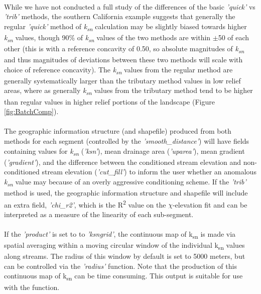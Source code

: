 \paragraph{}While we have not conducted a full study of the differences of the basic \textit{'quick'} vs \textit{'trib'} methods, the southern California example suggests that generally the regular \textit{'quick'} method of \textit{k\textsubscript{sn}} calculation may be slightly biased towards higher \textit{k\textsubscript{sn}} values, though 90\% of \textit{k\textsubscript{sn}} values of the two methods are within $\pm$50 of each other (this is with a reference concavity of 0.50, so absolute magnitudes of \textit{k\textsubscript{sn}} and thus magnitudes of deviations between these two methods will scale with choice of reference concavity). The \textit{k\textsubscript{sn}} values from the regular method are generally systematically larger than the tributary method values in low relief areas, where as generally \textit{k\textsubscript{sn}} values from the tributary method tend to be higher than regular values in higher relief portions of the landscape (Figure \ref{fig:BatchComp}). 

\paragraph{}The geographic information structure (and shapefile) produced from both methods for each segment (controlled by the \textit{'smooth\_distance'}) will have fields containing values for \textit{k\textsubscript{sn}} (\textit{'ksn'}), mean drainage area (\textit{'uparea'}), mean gradient (\textit{'gradient'}), and the difference between the conditioned stream elevation and non-conditioned stream elevation (\textit{'cut\_fill'}) to inform the user whether an anomalous \textit{k\textsubscript{sn}} value may because of an overly aggressive conditioning scheme. If the \textit{'trib'} method is used, the geographic information structure and shapefile will include an extra field, \textit{'chi\_r2'}, which is the R\textsuperscript{2} value on the $\chi$-elevation fit and can be interpreted as a measure of the linearity of each sub-segment. 

\paragraph{}If the \textit{'product'} is set to to \textit{'ksngrid'}, the continuous map of k\textsubscript{sn} is made via spatial averaging within a moving circular window of the individual k\textsubscript{sn} values along streams. The radius of this window by default is set to 5000 meters, but can be controlled via the \textit{'radius'} function. Note that the production of this continuous map of k\textsubscript{sn} can be time consuming. This output is suitable for use with the  function.

